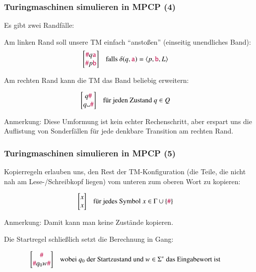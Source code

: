 \documentclass[aspectratio=1610,onlymath]{beamer}
\begin{document}
\begin{frame}\frametitle{Turingmaschinen simulieren in MPCP (4)}

Es gibt zwei \alert{Randfälle:}\bigskip

Am linken Rand soll unsere TM einfach "`anstoßen"' (einseitig unendliches Band):
\begin{align*}
\left[\begin{matrix}\mathtt{\textcolor{purple}{\#}}q\mathtt{\textcolor{purple}{a}}\\\mathtt{\textcolor{purple}{\#}}p\mathtt{\textcolor{purple}{b}}\end{matrix}\right]\quad
	& \text{falls $\delta(q,\mathtt{\textcolor{purple}{a}})=\langle{p,\ensuremath{\mathtt{\textcolor{purple}{b}}},L}\rangle$}
\end{align*}

Am rechten Rand kann die TM das Band beliebig erweitern:

\begin{align*}
\left[\begin{matrix}q\Sterm{\#}\\q\blank\Sterm{\#}\end{matrix}\right]\quad
	& \text{für jeden Zustand $q\in Q$}
\end{align*}

\textcolor{devilscss}{Anmerkung: Diese Umformung ist kein echter Rechenschritt, aber erspart uns die Auflistung von Sonderfällen für jede denkbare Transition am rechten Rand.}

\end{frame}

\begin{frame}\frametitle{Turingmaschinen simulieren in MPCP (5)}

\alert{Kopierregeln} erlauben uns, den Rest der TM-Konfiguration (die Teile, die nicht nah am Lese-/Schreibkopf liegen) vom unteren zum oberen Wort zu kopieren:

\begin{align*}
\left[\begin{matrix}x\\ x\end{matrix}\right]\quad
	& \text{für jedes Symbol $x\in \Gamma\cup\{\mathtt{\textcolor{purple}{\#}}\}$}
\end{align*}

\textcolor{devilscss}{Anmerkung: Damit kann man keine Zustände kopieren.}
\bigskip\pause

Die \alert{Startregel} schließlich setzt die Berechnung in Gang:

\begin{align*}
\left[\begin{matrix}\mathtt{\textcolor{purple}{\#}}\\ \mathtt{\textcolor{purple}{\#}}q_0 w\mathtt{\textcolor{purple}{\#}}\end{matrix}\right]\quad
	& \text{wobei $q_0$ der Startzustand und $w\in\Sigma^*$ das Eingabewort ist}
\end{align*}

\end{frame}
\end{document}
